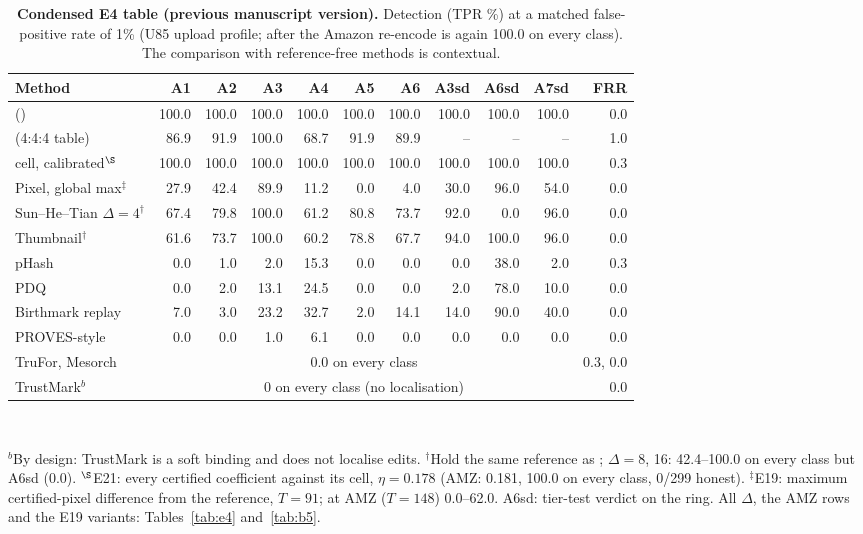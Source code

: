 \documentclass[10pt]{article}
\begin{document}
\begin{table}[!htbp]
\centering
\caption{\textbf{Condensed E4 table (previous manuscript version).} Detection (TPR \%) at a matched false-positive rate of 1\% (U85 upload profile; after the Amazon re-encode
\sys{} \tierX{} is again 100.0 on every class). The comparison with reference-free methods is contextual.}
\label{tab:e4-main}
\tabsmall
\setlength{\tabcolsep}{4pt}
\begin{tabular}{@{}lrrrrrrrrrr@{}}
\toprule
Method & A1 & A2 & A3 & A4 & A5 & A6 & A3sd & A6sd & A7sd & FRR\\
\midrule
\sys{} \tierX{} (\Ezero{}) & 100.0 & 100.0 & 100.0 & 100.0 & 100.0 & 100.0 & 100.0 & 100.0 & 100.0 & 0.0\\
\hspace{4pt}\tierT{} (4:4:4 table) & 86.9 & 91.9 & 100.0 & 68.7 & 91.9 & 89.9 & -- & -- & -- & 1.0\\
\Eone{} cell, calibrated$^{\S}$ & 100.0 & 100.0 & 100.0 & 100.0 & 100.0 & 100.0 & 100.0 & 100.0 & 100.0 & 0.3\\
Pixel, global max$^{\ddagger}$ & 27.9 & 42.4 & 89.9 & 11.2 & 0.0 & 4.0 & 30.0 & 96.0 & 54.0 & 0.0\\
Sun--He--Tian $\Delta{=}4^{\dagger}$ & 67.4 & 79.8 & 100.0 & 61.2 & 80.8 & 73.7 & 92.0 & 0.0 & 96.0 & 0.0\\
Thumbnail$^{\dagger}$ & 61.6 & 73.7 & 100.0 & 60.2 & 78.8 & 67.7 & 94.0 & 100.0 & 96.0 & 0.0\\
pHash & 0.0 & 1.0 & 2.0 & 15.3 & 0.0 & 0.0 & 0.0 & 38.0 & 2.0 & 0.3\\
PDQ & 0.0 & 2.0 & 13.1 & 24.5 & 0.0 & 0.0 & 2.0 & 78.0 & 10.0 & 0.0\\
Birthmark replay & 7.0 & 3.0 & 23.2 & 32.7 & 2.0 & 14.1 & 14.0 & 90.0 & 40.0 & 0.0\\
PROVES-style & 0.0 & 0.0 & 1.0 & 6.1 & 0.0 & 0.0 & 0.0 & 0.0 & 0.0 & 0.0\\
TruFor, Mesorch & \multicolumn{9}{c}{0.0 on every class} & 0.3, 0.0\\
TrustMark$^{b}$ & \multicolumn{9}{c}{0 on every class (no localisation)} & 0.0\\
\bottomrule
\end{tabular}\\[2pt]
\parbox{\textwidth}{\footnotesize $^{b}$By design: TrustMark is a soft binding and does not localise
edits. $^{\dagger}$Hold the same reference as \sys{}; $\Delta{=}8$, 16: 42.4--100.0
on every class but A6sd (0.0). $^{\S}$E21: every certified coefficient against its cell, $\eta{=}0.178$ (AMZ: 0.181, 100.0 on every class, 0/299
honest). $^{\ddagger}$E19: maximum certified-pixel difference from the reference, $T{=}91$; at AMZ ($T{=}148$)
0.0--62.0. A6sd: tier-test verdict on the ring. All
$\Delta$, the AMZ rows and the E19 variants: Tables~\ref{tab:e4} and~\ref{tab:b5}.}
\end{table}
\end{document}

